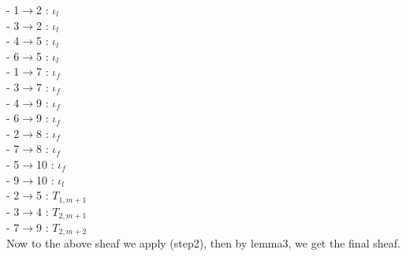 - 1$\rightarrow$2 : $\iota_l$\\
- 3$\rightarrow$2 : $\iota_l$\\
- 4$\rightarrow$5 : $\iota_l$\\
- 6$\rightarrow$5 : $\iota_l$\\
- 1$\rightarrow$7 : $\iota_f$\\
- 3$\rightarrow$7 : $\iota_f$\\
- 4$\rightarrow$9 : $\iota_f$\\
- 6$\rightarrow$9 : $\iota_f$\\
- 2$\rightarrow$8 : $\iota_f$\\
- 7$\rightarrow$8 : $\iota_f$\\
- 5$\rightarrow$10 : $\iota_f$\\
- 9$\rightarrow$10 : $\iota_l$\\
- 2$\rightarrow$5 : $T_{1,m+1}$\\
- 3$\rightarrow$4 : $T_{2,m+1}$\\
- 7$\rightarrow$9 : $T_{2,m+2}$\\

Now to the above sheaf we apply (step2), then by lemma3, we get the final sheaf.